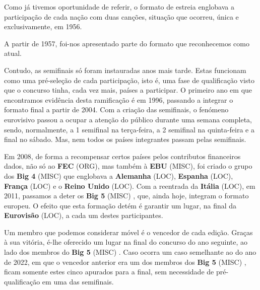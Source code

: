\documentclass[12pt,a4paper]{article}
\begin{document}
Como já tivemos oportunidade de referir, o formato de estreia englobava a participação de cada nação com duas canções, situação que ocorreu, única e exclusivamente, em 1956.

A partir de 1957, foi-nos apresentado parte do formato que reconhecemos como atual.

Contudo, as semifinais só foram instauradas anos mais tarde. Estas funcionam como uma pré-seleção de cada participação, isto é, uma fase de qualificação visto que o concurso tinha, cada vez mais, países a participar. O primeiro ano em que encontramos evidência desta ramificação é em 1996, passando a integrar o formato final a partir de 2004. Com a criação  das  semifinais,  o  fenómeno  eurovisivo  passou  a  ocupar  a  atenção  do  público durante  uma  semana  completa,  sendo,  normalmente,  a  1  semifinal  na  terça-feira,  a  2 semifinal na quinta-feira e a final no sábado. Mas, nem todos os países integrantes passam pelas semifinais.

Em  2008,  de  forma  a  recompensar  certos  países  pelos  contributos  financeiros dados, não só ao \textbf{FEC} (ORG), mas também à \textbf{EBU} (MISC), foi criado o grupo dos \textbf{Big 4} (MISC) que englobava a  \textbf{Alemanha} (LOC),  \textbf{Espanha} (LOC),  \textbf{França} (LOC)  e  o  \textbf{Reino  Unido} (LOC).  Com  a  reentrada  da  \textbf{Itália} (LOC),  em  2011, passamos a deter os \textbf{Big 5} (MISC) , que, ainda hoje, integram o formato europeu. O efeito que esta formação detém é garantir um lugar, na final da \textbf{Eurovisão} (LOC), a cada um destes participantes.

Um membro que podemos considerar móvel é o vencedor de cada edição. Graças à sua vitória,  é-lhe  oferecido  um  lugar  na  final  do  concurso  do  ano  seguinte,  ao  lado  dos membros  do \textbf{Big  5} (MISC) .  Caso  ocorra  um  caso  semelhante  ao  do  ano  de  2022,  em  que  o vencedor anterior era um dos membros dos \textbf{Big 5} (MISC) , ficam somente estes cinco apurados para a final, sem necessidade de pré-qualificação em uma das semifinais.
\end{document}
